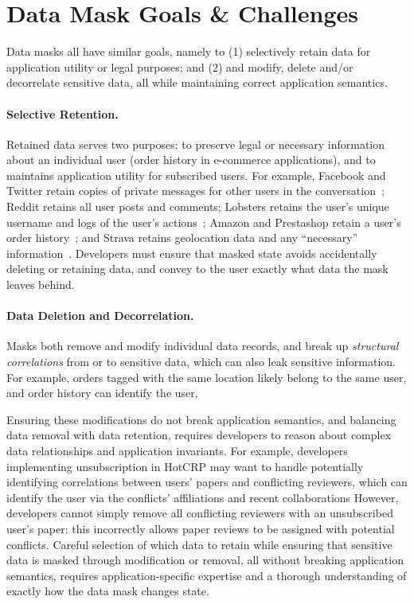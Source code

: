\section{Data Mask Goals \& Challenges}

Data masks all have similar goals, namely to (1) selectively retain data for application
utility or legal purposes; and (2) and modify, delete and/or decorrelate sensitive data, all while
maintaining correct application semantics.

\paragraph{Selective Retention.}
Retained data serves two purposes: to preserve legal or necessary information about an individual
user (\eg order history in e-commerce applications), and to maintains application utility for
subscribed users.  For example, Facebook and Twitter retain copies of private messages for other users in
the conversation~\cite{facebook:privacy, twitter:privacy}; Reddit retains all user posts and comments;
Lobsters retains the user's unique username and logs of the user's actions~\cite{reddit:privacy};
Amazon and Prestashop retain a user's order history~\cite{amazon:privacy, prestashop:privacy}; and
Strava retains geolocation data and any ``necessary'' information~\cite{strava:privacy}. 
Developers must ensure that masked state avoids accidentally deleting or retaining data, and convey
to the user exactly what data the mask leaves behind.

\paragraph{Data Deletion and Decorrelation.}
Masks both remove and modify individual data records, and break up \emph{structural correlations}
from or to sensitive data, which can also leak sensitive information. For example, orders tagged
with the same location likely belong to the same user, and order history can identify the user. 

Ensuring these modifications do not break application semantics, and balancing data removal with
data retention, requires developers to reason about complex data relationships and application
invariants.  For example, developers implementing unsubscription in HotCRP may want to handle
potentially identifying correlations between users' papers and conflicting reviewers, which can
identify the user via the conflicts' affiliations and recent collaborations However, developers
cannot simply remove all conflicting reviewers with an unsubscribed user's paper: this incorrectly
allows paper reviews to be assigned with potential conflicts. Careful selection of which data to
retain while ensuring that sensitive data is masked through modification or removal, all without
breaking application semantics, requires application-specific expertise and a thorough understanding
of exactly how the data mask changes state.

